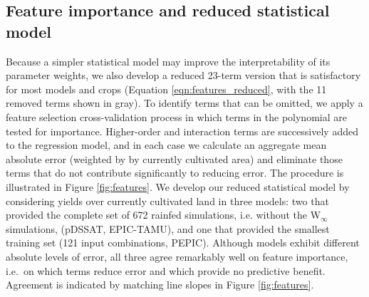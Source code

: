\documentclass[gmdd]{copernicus} %
\begin{document}
\subsection{Feature importance and reduced statistical model}
\label{sec:features}

Because a simpler statistical model may improve the interpretability of its parameter weights, we also develop a reduced 23-term version that is satisfactory for most models and crops (Equation \ref{eqn:features_reduced}, with the 11 removed terms shown in  {\color{dark-gray} gray}).
To identify terms that can be omitted, we apply a feature selection cross-validation process in which terms in the polynomial are tested for importance. 
Higher-order and interaction terms are successively added to the regression model, and in each case we calculate an aggregate mean absolute error (weighted by by currently cultivated area) and eliminate those terms that do not contribute significantly to reducing error. 
The procedure is illustrated in Figure \ref{fig:features}. We develop our reduced statistical model by considering yields over currently cultivated land in three models: two that provided the complete set of 672 rainfed simulations, i.e. without the W$_{\infty}$ simulations,  (pDSSAT, EPIC-TAMU), and one that provided the smallest training set (121 input combinations, PEPIC).
Although models exhibit different absolute levels of error, all three agree remarkably well on feature importance, i.e.\ on which terms reduce error and which provide no predictive benefit. Agreement is indicated by matching line slopes in Figure \ref{fig:features}. 
 
\end{document}
